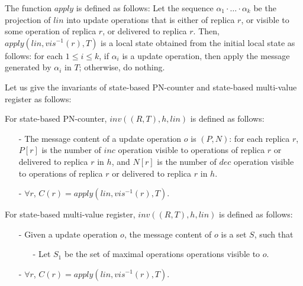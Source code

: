 The function $\mathit{apply}$ is defined as follows: Let the sequence $\alpha_1 \cdot \ldots \cdot \alpha_k$ be the projection of $\mathit{lin}$ into update operations that is either of replica $r$, or visible to some operation of replica $r$, or delivered to replica $r$. Then, $\mathit{apply}(\mathit{lin},\mathit{vis}^{-1}(r),T)$ is a local state obtained from the initial local state as follows: for each $1 \leq i \leq k$, if $\alpha_i$ is a update operation, then apply the message generated by $\alpha_i$ in $T$; otherwise, do nothing.

Let us give the invariants of state-based PN-counter and state-based multi-value register as follows:

\begin{example}
\label{example:correctness of state-based PN-counter}

For state-based PN-counter, $\mathit{inv}((R, T), h, \mathit{lin})$ is defined as follows:

\begin{itemize}
\setlength{\itemsep}{0.5pt}
\item[-] The message content of a update operation $o$ is $(P,N)$: for each replica $r$, $P[r]$ is the number of $\mathit{inc}$ operation visible to operations of replica $r$ or delivered to replica $r$ in $h$, and $N[r]$ is the number of $\mathit{dec}$ operation visible to operations of replica $r$ or delivered to replica $r$ in $h$.

\item[-] $\forall r$, $C(r) = \mathit{apply}(\mathit{lin},\mathit{vis}^{-1}(r),T)$.
\end{itemize}
\end{example}

\begin{example}
\label{example:correctness of state-based multi-value register}

For state-based multi-value register, $\mathit{inv}((R, T), h, \mathit{lin})$ is defined as follows:

\begin{itemize}
\setlength{\itemsep}{0.5pt}
\item[-] Given a update operation $o$, the message content of $o$ is a set $S$, such that

    \begin{itemize}
    \setlength{\itemsep}{0.5pt}
    \item[-] Let $S_1$ be the set of maximal operations operations visible to $o$.
    \end{itemize}

\item[-] $\forall r$, $C(r) = \mathit{apply}(\mathit{lin},\mathit{vis}^{-1}(r),T)$.
\end{itemize}
\end{example}




